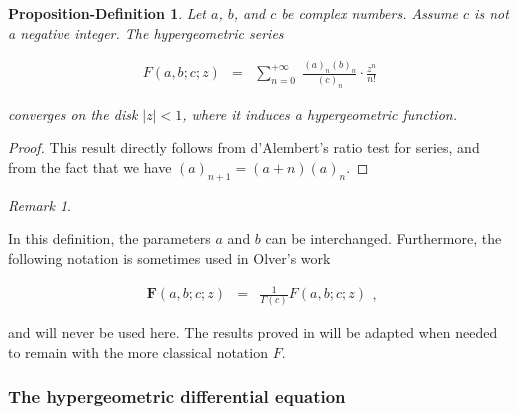 \documentclass{jams-l}
\newtheorem{proposition-definition}[theorem]{Proposition-Definition}
\theoremstyle{definition}
\theoremstyle{remark}
\newtheorem{remark}[theorem]{Remark}
\numberwithin{equation}{section}
\begin{document}
            \begin{proposition-definition}
        
                Let $a$, $b$, and $c$ be complex numbers. Assume $c$ is not a negative integer. The hypergeometric series
            
                \[ \begin{array}{lll}
                        F \left( a, b; c; z \right) & = & \sum\limits_{n=0}^{+\infty} \; \frac{\left( a \right)_n \left( b \right)_n}{\left( c \right)_n} \cdot \frac{z^n}{n!}
                    \end{array} \]
            
                \noindent converges on the disk $\left \vert z \right \vert < 1$, where it induces a hypergeometric function.
        
            \end{proposition-definition}
            
            \begin{proof}
            
                This result directly follows from d'Alembert's ratio test for series, and from the fact that we have $\left( a \right)_{n+1} = \left( a+n \right) \left( a \right)_n$.
            
            \end{proof}
        
            \begin{remark}
            \label{RmkHypergeometricInterchangeAB}
        
                In this definition, the parameters $a$ and $b$ can be interchanged. Furthermore, the following notation is sometimes used in Olver's work
                
                \[ \begin{array}{lll}
                        \bm{F} \left( a, b; c; z \right) & = & \frac{1}{\Gamma \left( c \right)} F \left( a, b; c; z \right)
                    \end{array} ,\]
                
                \noindent and will never be used here. The results proved in \cite{MR1429619} will be adapted when needed to remain with the more classical notation $F$.
        
            \end{remark}
        
        
        \subsubsection{The hypergeometric differential equation}
        
\end{document}
